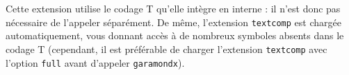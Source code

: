 \documentclass[12pt,english,french]{article}
\begin{document}
%
%

Cette extension utilise le codage T qu'elle intègre en interne : il n'est donc pas nécessaire de l'appeler séparément. De même, l'extension \texttt{textcomp} est chargée automatiquement, vous donnant accès à de nombreux symboles absents dans le codage T (cependant, il est préférable de charger l'extension \texttt{textcomp} avec l'option \texttt{full} avant d'appeler \texttt{garamondx}).
\end{document}
